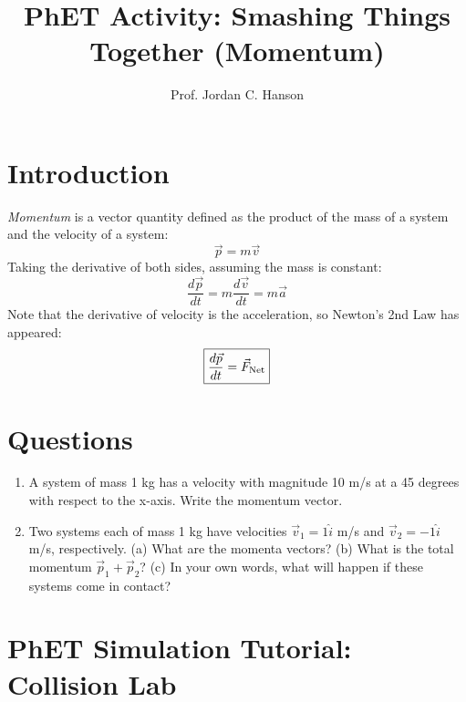 \documentclass{article}
\begin{document}
\small

\title{PhET Activity: Smashing Things Together (Momentum)}
\author{Prof. Jordan C. Hanson}

\maketitle

\section{Introduction}

\textit{Momentum} is a vector quantity defined as the product of the mass of a system and the velocity of a system:
\begin{equation}
\vec{p} = m\vec{v}
\end{equation}
Taking the derivative of both sides, assuming the mass is constant:
\begin{equation}
\frac{d\vec{p}}{dt} = m \frac{d\vec{v}}{dt} = m\vec{a}
\end{equation}
Note that the derivative of velocity is the acceleration, so Newton's 2nd Law has appeared:
\begin{equation}
\boxed{
\frac{d\vec{p}}{dt} = \vec{F}_{\rm Net}
}
\end{equation}

\section{Questions}

\begin{enumerate}
\item A system of mass 1 kg has a velocity with magnitude 10 m/s at a 45 degrees with respect to the x-axis.  Write the momentum vector. \\ \vspace{1cm}
\item Two systems each of mass 1 kg have velocities $\vec{v}_1 = 1\hat{i}$ m/s and $\vec{v}_2 = -1\hat{i}$ m/s, respectively. (a) What are the momenta vectors? (b) What is the total momentum $\vec{p}_1 + \vec{p}_2$? (c) In your own words, what will happen if these systems come in contact? \label{q:2} \\ \vspace{2cm}
\end{enumerate}

\section{PhET Simulation Tutorial: Collision Lab}
\end{document}
